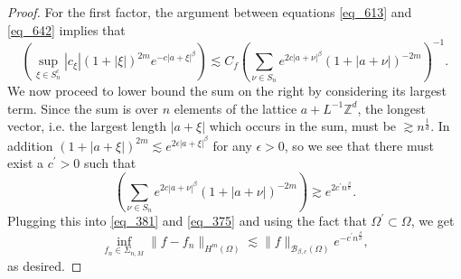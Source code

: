 \begin{proof}
 For the first factor, the argument between equations \eqref{eq_613} and \eqref{eq_642} implies that
 \begin{equation}\label{eq_381}
  \left(\sup_{\xi\in S_n^c} |c_\xi|(1+|\xi|)^{2m}e^{-c|a+\xi|^{\beta}} \right) \lesssim C_f\left(\sum_{\nu\in S_n} e^{2c|a+\nu|^{\beta}}(1 + |a + \nu|)^{-2m}\right)^{-1}.
 \end{equation}
 We now proceed to lower bound the sum on the right by considering its largest term. Since the sum is over $n$ elements of the lattice $a + L^{-1}\mathbb{Z}^d$, the longest vector, i.e. the largest length $|a+\xi|$ which occurs in the sum, must be $\gtrsim n^{\frac{1}{d}}$. In addition $(1 + |a + \xi|)^{2m} \lesssim e^{2\epsilon|a+\xi|^{\beta}}$ for any $\epsilon > 0$, so we see that there must exist a $c^\prime > 0$ such that
 \begin{equation}
  \left(\sum_{\nu\in S_n} e^{2c|a+\nu|^{\beta}}(1 + |a + \nu|)^{-2m}\right) \gtrsim e^{2c^\prime n^{\frac{\beta}{d}}}.
 \end{equation}
 Plugging this into \eqref{eq_381} and \eqref{eq_375} and using the fact that $\Omega^\prime \subset \Omega$, we get
 \begin{equation}
  \inf_{f_n\in \Sigma_{n,M}} \|f-f_n\|_{H^m(\Omega)} \lesssim \|f\|_{\mathcal{B}_{\beta,c}(\Omega)}e^{-c^\prime n^{\frac{\beta}{d}}},
 \end{equation}
 as desired.

\end{proof}

